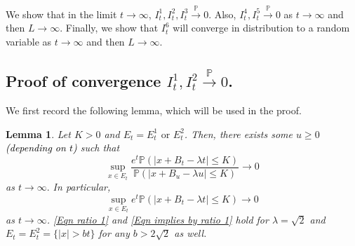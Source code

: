 \documentclass[a4paper,reqno]{amsart}%
\newcommand{\1}{\mathbf 1}
\theoremstyle{mine}
\numberwithin{theorem}{section}
\newtheorem{lemma}[theorem]{Lemma}
\numberwithin{equation}{section}
\theoremstyle{remark}
\begin{document}
\vspace{3mm}

We show that in the limit $t \to \infty$,  $I_t^1, I_t^2, I_t^3 \overset{\mathbb{P}}{\to} 0 $. Also, $I_t^4, I_t^5 \overset{\mathbb{P}}{\to} 0$ as $t \to \infty$ and then $L\to \infty$. Finally, we show that $I_t^6$ will converge in distribution to a random variable as $t \to \infty$ and then $L\to \infty$.



\subsection{Proof of convergence $I_t^1, I_t^2 \overset{\mathbb{P}}{\to} 0$.}

We first record the following lemma, which will be used in the proof. 


\begin{lemma}\label{Lemma Ratio 1}
Let $K>0$ and $E_t=E_t^1 \text{ or } E_t^2$. Then, there exists some $u \ge 0$ \textcolor{black}{(depending on $t$)} such that
    \begin{equation}\label{Eqn ratio 1}
        \sup_{x \in E_t} \frac{e^t \mathbb P(|x+B_t-\lambda t|\le K)}{\mathbb P(|x+B_u-\lambda u|\le K)} \longrightarrow 0
    \end{equation}
    as $t \to \infty.$ 
    In particular, 
    \begin{equation}\label{Eqn implies by ratio 1}
        \sup_{x\in E_t} e^t \mathbb P(|x+B_t-\lambda t|\le K) \to 0
    \end{equation}
    as $t \to \infty$. \eqref{Eqn ratio 1} and \eqref{Eqn implies by ratio 1} hold for $\lambda =\sqrt{2}$ and $E_t = E_{t}^2 = \{|x| > bt \}$ for any $b>2\sqrt{2}$ as well.  
    
    
\end{lemma}
\end{document}
